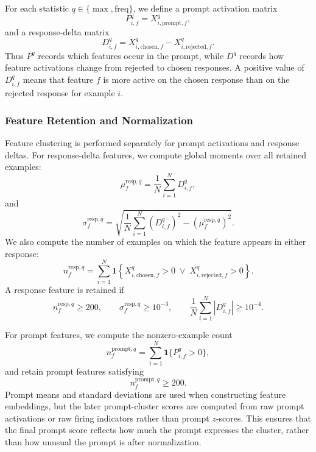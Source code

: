 \documentclass{article} %
\begin{document}
For each statistic $q \in \{\max,\text{freq}\}$, we define a prompt activation matrix
\begin{equation}
P^q_{i,f} = X^q_{i,\text{prompt},f},
\end{equation}
and a response-delta matrix
\begin{equation}
D^q_{i,f} = X^q_{i,\text{chosen},f} - X^q_{i,\text{rejected},f}.
\end{equation}
Thus $P^q$ records which features occur in the prompt, while $D^q$ records how feature activations change from rejected to chosen responses. A positive value of $D^q_{i,f}$ means that feature $f$ is more active on the chosen response than on the rejected response for example $i$.

\subsubsection{Feature Retention and Normalization}
\label{app:pcfs-retention-normalization}

Feature clustering is performed separately for prompt activations and response deltas. For response-delta features, we compute global moments over all retained examples:
\begin{equation}
\mu^{\text{resp},q}_f = \frac{1}{N}\sum_{i=1}^N D^q_{i,f},
\end{equation}
and
\begin{equation}
\sigma^{\text{resp},q}_f = \sqrt{\frac{1}{N}\sum_{i=1}^N (D^q_{i,f})^2 - \left(\mu^{\text{resp},q}_f\right)^2}.
\end{equation}
We also compute the number of examples on which the feature appears in either response:
\begin{equation}
n^{\text{resp},q}_f = \sum_{i=1}^N \mathbf{1}\left\{X^q_{i,\text{chosen},f} > 0 \;\vee\; X^q_{i,\text{rejected},f} > 0\right\}.
\end{equation}
A response feature is retained if
\begin{equation}
n^{\text{resp},q}_f \geq 200, \qquad \sigma^{\text{resp},q}_f \geq 10^{-3}, \qquad \frac{1}{N}\sum_{i=1}^N |D^q_{i,f}| \geq 10^{-4}.
\end{equation}

For prompt features, we compute the nonzero-example count
\begin{equation}
n^{\text{prompt},q}_f = \sum_{i=1}^N \mathbf{1}\{P^q_{i,f} > 0\},
\end{equation}
and retain prompt features satisfying
\begin{equation}
n^{\text{prompt},q}_f \geq 200.
\end{equation}
Prompt means and standard deviations are used when constructing feature embeddings, but the later prompt-cluster scores are computed from raw prompt activations or raw firing indicators rather than prompt $z$-scores. This ensures that the final prompt score reflects how much the prompt expresses the cluster, rather than how unusual the prompt is after normalization.
\end{document}
